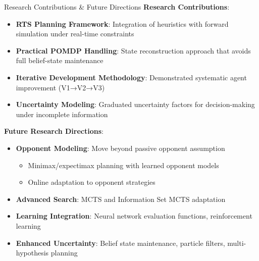 \documentclass{beamer}
\begin{document}
\begin{frame}{Research Contributions \& Future Directions}
  \textbf{Research Contributions}:
  \begin{itemize}
    \item \textbf{RTS Planning Framework}: Integration of heuristics with forward simulation under real-time constraints
    \item \textbf{Practical POMDP Handling}: State reconstruction approach that avoids full belief-state maintenance
    \item \textbf{Iterative Development Methodology}: Demonstrated systematic agent improvement (V1→V2→V3)
    \item \textbf{Uncertainty Modeling}: Graduated uncertainty factors for decision-making under incomplete information
  \end{itemize}
  
  \textbf{Future Research Directions}:
  \begin{itemize}
    \item \textbf{Opponent Modeling}: Move beyond passive opponent assumption
    \begin{itemize}
      \item Minimax/expectimax planning with learned opponent models
      \item Online adaptation to opponent strategies
    \end{itemize}
    \item \textbf{Advanced Search}: MCTS and Information Set MCTS adaptation
    \item \textbf{Learning Integration}: Neural network evaluation functions, reinforcement learning
    \item \textbf{Enhanced Uncertainty}: Belief state maintenance, particle filters, multi-hypothesis planning
  \end{itemize}
\end{frame}
\end{document}
